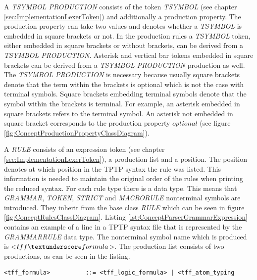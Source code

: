A \textit{T\textunderscore SYMBOL \textunderscore PRODUCTION} consists of the token \textit{T\textunderscore SYMBOL} (see chapter \ref{sec:ImplementationLexerToken}) and additionally a production property.
The production property can take two values and denotes whether a \textit{T\textunderscore SYMBOL} is
embedded in square brackets or not. In the production rules a \textit{T\textunderscore SYMBOL}
token, either embedded in square brackets or without brackets, can be derived
from a \textit{T\textunderscore SYMBOL \textunderscore PRODUCTION}. Asterisk and vertical bar tokens embedded in square
brackets can be derived from a \textit{T\textunderscore SYMBOL \textunderscore PRODUCTION} production as well.
The \textit{T\textunderscore SYMBOL \textunderscore PRODUCTION} is necessary because usually square brackets denote that the term within the brackets is optional which is not the case with terminal symbols.
Square brackets embedding terminal symbols denote that the symbol within the brackets is terminal.
For example, an asterisk embedded in square brackets refers to the terminal symbol.
An asterisk not embedded in square bracket corresponds to the production property $optional$ (see figure \ref{fig:ConceptProductionPropertyClassDiagram}).

%
%

A \textit{RULE} consists of an expression token (see chapter \ref{sec:ImplementationLexerToken}), a production list and a position.
The position denotes at which position in the \ac{TPTP} syntax the rule was listed.
This information is needed to maintain the original order of the rules when printing the reduced syntax.
For each rule type there is a data type.
This means that \textit{GRAMMAR}, \textit{TOKEN}, \textit{STRICT} and \textit{MACRO\textunderscore RULE} nonterminal symbols are introduced. They inherit from the base class \textit{RULE} which can be seen in figure \ref{fig:ConceptRulesClassDiagram}.
Listing \ref{lst:ConceptParserGrammarExpression} contains an example of a line in a \ac{TPTP} syntax file that is represented by the \textit{GRAMMAR\textunderscore RULE} data type.
The nonterminal symbol name which is produced is <$tff \textunderscore formula$>.  The production list consists of two productions, as can be seen in the listing.
\begin{lstlisting}[basicstyle=\scriptsize	,caption= Grammar expression,label= lst:ConceptParserGrammarExpression]
<tff_formula>          ::= <tff_logic_formula> | <tff_atom_typing
\end{lstlisting}


